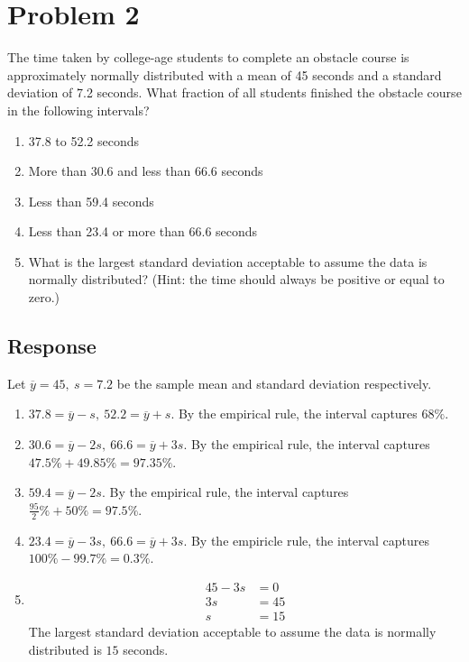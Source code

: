 \documentclass[13pt]{article}
\begin{document}
\newpage
\section*{Problem 2}
The time taken by college-age students to complete an obstacle course is approximately
normally distributed with a mean of 45 seconds and a standard deviation of 7.2 seconds.
What fraction of all students finished the obstacle course in the following intervals?
\begin{enumerate}[label=\alph*)]
\item 37.8 to 52.2 seconds
\item More than 30.6 and less than 66.6 seconds
\item Less than 59.4 seconds
\item Less than 23.4 or more than 66.6 seconds
\item What is the largest standard deviation acceptable to assume the data is normally distributed?
  (Hint: the time should always be positive or equal to zero.)
\end{enumerate}

\subsection*{Response}
Let $\overline{y} = 45,\ s = 7.2$ be the sample mean and standard deviation respectively.
\begin{enumerate}[label=\alph*)]
\item $37.8 = \overline{y} - s, \ 52.2 = \overline{y} + s$. By the empirical rule, the interval captures $68\%$.
\item $30.6 = \overline{y} - 2s, \ 66.6 = \overline{y} + 3s$. By the empirical rule, the interval captures
  $47.5\% + 49.85\% = 97.35\%$.
\item $59.4 = \overline{y} - 2s$. By the empirical rule, the interval captures $\frac{95}{2}\% + 50\% = 97.5\%$.
\item $23.4 = \overline{y} - 3s, \ 66.6 = \overline{y} + 3s$. By the empiricle rule, the interval captures
  $100\% - 99.7\% = 0.3\%$.
\item
  \begin{align*}
    45 - 3s &= 0 \\
    3s &= 45 \\
    s &= 15
  \end{align*}
  The largest standard deviation acceptable to assume the data is normally distributed is $15$ seconds.
\end{enumerate}
\end{document}
